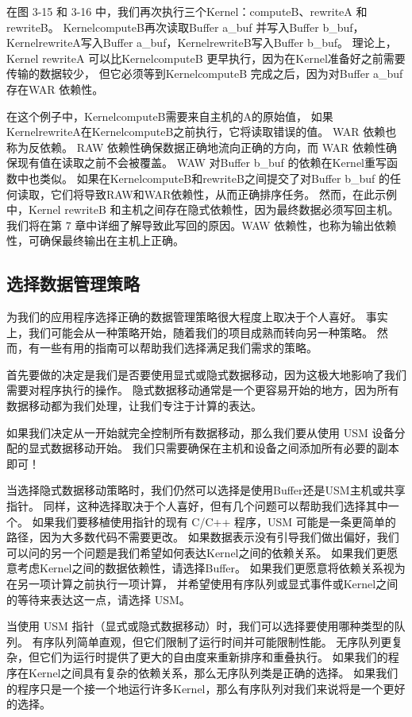 在图 3-15 和 3-16 中，我们再次执行三个Kernel：computeB、rewriteA 和 rewriteB。 
KernelcomputeB再次读取Buffer a\_buf 并写入Buffer b\_buf，
KernelrewriteA写入Buffer a\_buf，KernelrewriteB写入Buffer b\_buf。 
理论上，Kernel rewriteA 可以比KernelcomputeB 更早执行，因为在Kernel准备好之前需要传输的数据较少，
但它必须等到KernelcomputeB 完成之后，因为对Buffer a\_buf 存在WAR 依赖性。

在这个例子中，KernelcomputeB需要来自主机的A的原始值，
如果KernelrewriteA在KernelcomputeB之前执行，它将读取错误的值。 
WAR 依赖也称为反依赖。 RAW 依赖性确保数据正确地流向正确的方向，而 WAR 依赖性确保现有值在读取之前不会被覆盖。 
WAW 对Buffer b\_buf 的依赖在Kernel重写函数中也类似。 
如果在KernelcomputeB和rewriteB之间提交了对Buffer b\_buf 的任何读取，它们将导致RAW和WAR依赖性，从而正确排序任务。 
然而，在此示例中，Kernel rewriteB 和主机之间存在隐式依赖性，因为最终数据必须写回主机。 
我们将在第 7 章中详细了解导致此写回的原因。WAW 依赖性，也称为输出依赖性，可确保最终输出在主机上正确。

\subsection{选择数据管理策略}
为我们的应用程序选择正确的数据管理策略很大程度上取决于个人喜好。 
事实上，我们可能会从一种策略开始，随着我们的项目成熟而转向另一种策略。 
然而，有一些有用的指南可以帮助我们选择满足我们需求的策略。

首先要做的决定是我们是否要使用显式或隐式数据移动，因为这极大地影响了我们需要对程序执行的操作。 
隐式数据移动通常是一个更容易开始的地方，因为所有数据移动都为我们处理，让我们专注于计算的表达。

如果我们决定从一开始就完全控制所有数据移动，那么我们要从使用 USM 设备分配的显式数据移动开始。 
我们只需要确保在主机和设备之间添加所有必要的副本即可！

当选择隐式数据移动策略时，我们仍然可以选择是使用Buffer还是USM主机或共享指针。 
同样，这种选择取决于个人喜好，但有几个问题可以帮助我们选择其中一个。 
如果我们要移植使用指针的现有 C/C++ 程序，USM 可能是一条更简单的路径，因为大多数代码不需要更改。 
如果数据表示没有引导我们做出偏好，我们可以问的另一个问题是我们希望如何表达Kernel之间的依赖关系。 
如果我们更愿意考虑Kernel之间的数据依赖性，请选择Buffer。 
如果我们更愿意将依赖关系视为在另一项计算之前执行一项计算，
并希望使用有序队列或显式事件或Kernel之间的等待来表达这一点，请选择 USM。

当使用 USM 指针（显式或隐式数据移动）时，我们可以选择要使用哪种类型的队列。 
有序队列简单直观，但它们限制了运行时间并可能限制性能。 
无序队列更复杂，但它们为运行时提供了更大的自由度来重新排序和重叠执行。 
如果我们的程序在Kernel之间具有复杂的依赖关系，那么无序队列类是正确的选择。 
如果我们的程序只是一个接一个地运行许多Kernel，那么有序队列对我们来说将是一个更好的选择。

